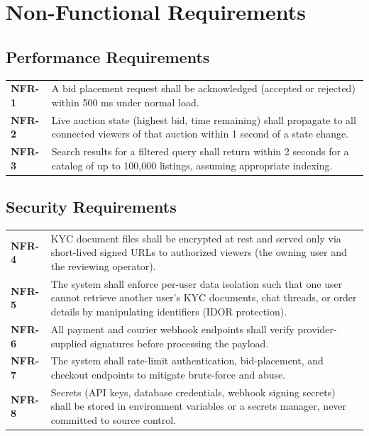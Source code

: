 \documentclass[11pt,a4paper]{report}
\newenvironment{reqtable}{\begin{longtable}{p{2.2cm}p{11.5cm}}}{\end{longtable}}
\begin{document}
\chapter{Non-Functional Requirements}

\section{Performance Requirements}
\begin{reqtable}
\textbf{NFR-1} & A bid placement request shall be acknowledged (accepted or rejected) within 500 ms under normal load. \\
\textbf{NFR-2} & Live auction state (highest bid, time remaining) shall propagate to all connected viewers of that auction within 1 second of a state change. \\
\textbf{NFR-3} & Search results for a filtered query shall return within 2 seconds for a catalog of up to 100,000 listings, assuming appropriate indexing. \\
\end{reqtable}

\section{Security Requirements}
\begin{reqtable}
\textbf{NFR-4} & KYC document files shall be encrypted at rest and served only via short-lived signed URLs to authorized viewers (the owning user and the reviewing operator). \\
\textbf{NFR-5} & The system shall enforce per-user data isolation such that one user cannot retrieve another user's KYC documents, chat threads, or order details by manipulating identifiers (IDOR protection). \\
\textbf{NFR-6} & All payment and courier webhook endpoints shall verify provider-supplied signatures before processing the payload. \\
\textbf{NFR-7} & The system shall rate-limit authentication, bid-placement, and checkout endpoints to mitigate brute-force and abuse. \\
\textbf{NFR-8} & Secrets (API keys, database credentials, webhook signing secrets) shall be stored in environment variables or a secrets manager, never committed to source control. \\
\end{reqtable}
\end{document}
